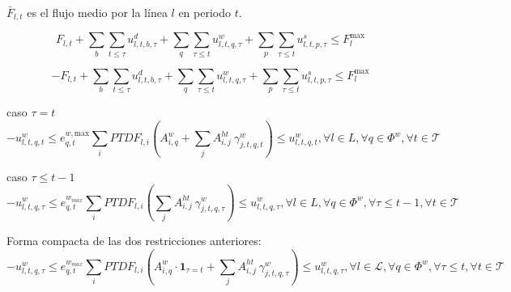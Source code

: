 $\bar{F}_{l, t}$ es el flujo medio por la línea $l$ en periodo $t$.

\begin{dmath}
F_{l, t} + \sum_{b}\sum_{t \leq \tau} u^{d}_{l,t,b,\tau} + \sum_{q} \sum_{\tau \leq t}u^{w}_{l,t,q,\tau}+ \sum_{p} \sum_{\tau \leq t} u^{s}_{l,t,p,\tau} \leq F_{l}^{\text{max}}
\end{dmath}

\begin{dmath}
- F_{l, t} + \sum_{b}\sum_{t \leq \tau} u^{d}_{l,t,b,\tau} + \sum_{q} \sum_{\tau \leq t}u^{w}_{l,t,q,\tau}+ \sum_{p} \sum_{\tau \leq t} u^{s}_{l,t,p,\tau} \leq F_{l}^{\text{max}}
\end{dmath}



caso $\tau = t$
\begin{equation}
-u_{l,t,q,t}^{w} \le e_{q,t}^{w,\text{max}} \sum_{i}PTDF_{l,i} \left( A_{i,q}^w + \sum_{j}A_{i,j}^{ht} \: \gamma_{j,t,q,t}^{w} \right) \le u_{l,t,q,t}^{w} , \forall l \in L, \forall q \in \Phi^{w}, \forall t \in \mathcal{T}
\end{equation}

caso $\tau \leq t-1$
\begin{equation}
-u_{l,t,q,\tau}^{w} \le e_{q,t}^{w_{max}} \sum_{i}PTDF_{l,i} \left( \sum_{j}A_{i,j}^{ht} \: \gamma_{j,t,q,\tau}^{w} \right) \le u_{l,t,q,\tau}^{w} , \forall l \in L, \forall q \in \Phi^{w}, \forall \tau \leq t - 1, \forall t \in \mathcal{T}
\end{equation}

Forma compacta de las dos restricciones anteriores:
\begin{equation}
-u_{l,t,q,\tau}^{w} \le e_{q,t}^{w_{max}} \sum_{i}PTDF_{l,i} \left( A_{i,q}^w \cdot \mathbf{1}_{\tau = t} + \sum_{j}A_{i,j}^{ht} \: \gamma_{j,t,q,\tau}^{w} \right) \le u_{l,t,q,\tau}^{w} , \forall l \in \mathcal{L}, \forall q \in \Phi^{w}, \forall \tau \leq t, \forall t \in \mathcal{T}
\end{equation}

